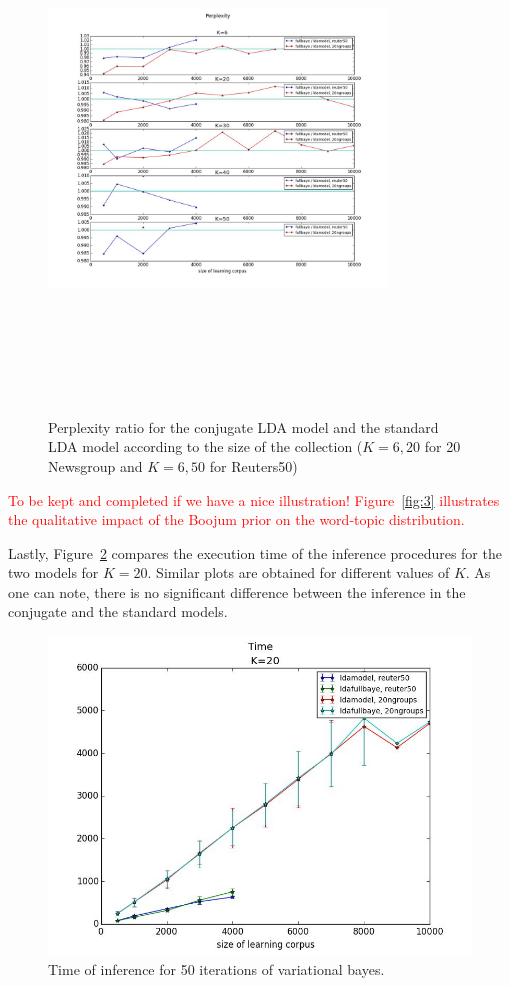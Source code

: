 \begin{figure}[ht]
\label{fig:pp_D}
\includegraphics[width=9cm, height=14cm]{results/pp_D}
\caption{Perplexity ratio for the conjugate LDA model and the standard LDA model according to the size of the collection ($K=6,20$ for 20 Newsgroup and $K=6,50$ for Reuters50)}
\end{figure}


\textcolor{red}{To be kept and completed if we have a nice illustration! Figure~\ref{fig:3} illustrates the qualitative impact of the Boojum prior on the word-topic distribution.}

Lastly, Figure~\ref{fig:time} compares the execution time of the inference procedures for the two models for $K=20$. Similar plots are obtained for different values of $K$. As one can note, there is no significant difference between the inference in the conjugate and the standard models.

\begin{figure}[h]
\label{fig:time}
\includegraphics[scale=0.4]{results/time}
\caption{Time of inference for 50 iterations of variational bayes.}
\end{figure}
